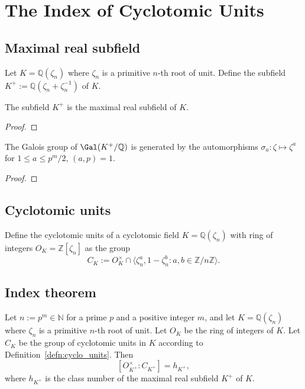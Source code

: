 \chapter{The Index of Cyclotomic Units}

\section{Maximal real subfield}
\begin{definition}\label{defn:K_plus}
    Let $K = \mathbb{Q}(\zeta_n)$ where $\zeta_n$ is a primitive $n$-th root of unit. 
    Define the subfield $K^+ := \mathbb{Q}(\zeta_n + \zeta_n^{-1})$ of $K$.
\end{definition}

\begin{lemma}\label{lem:K_plus_max_real_sub}
    The subfield $K^+$ is the maximal real subfield of $K$.
\end{lemma}

\begin{proof}
\end{proof}

\begin{lemma}\label{lem:gal_K_plus}
    The Galois group of $\Gal(K^+ / \mathbb{Q})$ is generated by the 
    automorphisms $\sigma_a \colon \zeta \mapsto \zeta^a$ for $1 \leq a \leq p^m / 2$, $(a, p) = 1$. 
\end{lemma}

\begin{proof}
\end{proof}

\section{Cyclotomic units}
\begin{definition}\label{defn:cyclo_units}
    Define the cyclotomic units of a cyclotomic field $K = \mathbb{Q}(\zeta_n)$ with ring of integers 
    $O_K = \mathbb{Z}[\zeta_n]$ as the group 
    $$
    C_K := O_K^\times \cap \langle \zeta_n^a, 1 - \zeta_n^b \colon a, b \in \mathbb{Z} / n \mathbb{Z}\rangle. 
    $$
\end{definition}

\section{Index theorem}
\begin{theorem}\label{thm:index_of_units}
    \notready
    Let $n := p^m \in \mathbb{N}$ for a prime $p$ and a positive integer $m$, and let $K = \mathbb{Q}(\zeta_n)$ where $\zeta_n$ is a primitive $n$-th root of unit. 
    Let $O_K$ be the ring of integers of $K$. 
    Let $C_K$ be the group of cyclotomic units in $K$ according to Definition~\ref{defn:cyclo_units}.
    Then
    \[
        [O_{K^+}^\times : C_{K^+}] = h_{K^+},
    \]
    where $h_{K^+}$ is the class number of the maximal real subfield $K^+$ of $K$.
\end{theorem}

